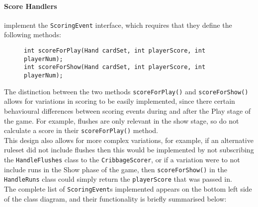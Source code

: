 \documentclass{article}
\begin{document}
\paragraph{Score Handlers} implement the \verb|ScoringEvent| interface, which requires that they define the following methods:
\begin{figure}[H]
\centering
\begin{BVerbatim}
int scoreForPlay(Hand cardSet, int playerScore, int playerNum);
int scoreForShow(Hand cardSet, int playerScore, int playerNum);
\end{BVerbatim}
\end{figure}
\noindent The distinction between the two methods \verb|scoreForPlay()| and \verb|scoreForShow()| allows for variations in scoring to be easily implemented, since there certain behavioural differences between scoring events during and after the Play stage of the game. For example, flushes are only relevant in the show stage, so do not calculate a score in their \verb|scoreForPlay()| method.\\[2mm]
This design also allows for more complex variations, for example, if an alternative ruleset did not include flushes then this would be implemented by not subscribing the \verb|HandleFlushes| class to the \verb|CribbageScorer|, or if a variation were to not include runs in the Show phase of the game, then \verb|scoreForShow()| in the \verb|HandleRuns| class could simply return the \verb|playerScore| that was passed in.\\[2mm]
The complete list of \verb|ScoringEvent|s implemented appears on the bottom left side of the class diagram, and their functionality is briefly summarised below:
\end{document}
